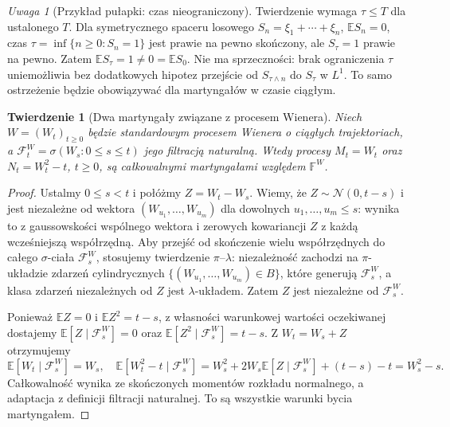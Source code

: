 \documentclass[11pt,a4paper,oneside]{report}
\numberwithin{equation}{chapter}
\theoremstyle{plain}
\newtheorem{twierdzenie}{Twierdzenie}[chapter]
\theoremstyle{definition}
\theoremstyle{remark}
\newtheorem{uwaga}{Uwaga}[chapter]
\newcommand{\E}{\mathbb{E}}
\newcommand{\calF}{\mathcal{F}}
\newcommand{\Normal}{\mathcal{N}}
\begin{document}
\begin{uwaga}[Przykład pułapki: czas nieograniczony]
Twierdzenie wymaga $\tau\le T$ dla ustalonego $T$.
Dla symetrycznego spaceru losowego
$S_n=\xi_1+\cdots+\xi_n$, $\E S_n=0$,
czas $\tau=\inf\{n\ge0:S_n=1\}$ jest prawie
na pewno skończony, ale $S_\tau=1$ prawie na pewno.
Zatem $\E S_\tau=1\ne0=\E S_0$.
Nie ma sprzeczności: brak ograniczenia $\tau$
uniemożliwia bez dodatkowych hipotez przejście
od $S_{\tau\wedge n}$ do $S_\tau$ w $L^1$.
To samo ostrzeżenie będzie obowiązywać dla
martyngałów w czasie ciągłym.
\end{uwaga}


\begin{twierdzenie}[Dwa martyngały związane z procesem Wienera]
Niech $W=(W_t)_{t\ge0}$ będzie standardowym procesem
Wienera o ciągłych trajektoriach,
a $\calF_t^W=\sigma(W_s:0\le s\le t)$ jego filtracją
naturalną. Wtedy procesy
$M_t=W_t$ oraz $N_t=W_t^2-t$, $t\ge0$,
są całkowalnymi martyngałami względem $\mathbb F^W$.
\end{twierdzenie}
\begin{proof}
Ustalmy $0\le s<t$ i połóżmy
$Z=W_t-W_s$. Wiemy, że $Z\sim\Normal(0,t-s)$
i jest niezależne od wektora
$(W_{u_1},\ldots,W_{u_m})$ dla dowolnych
$u_1,\ldots,u_m\le s$: wynika to z gaussowskości
wspólnego wektora i zerowych kowariancji $Z$
z każdą wcześniejszą współrzędną.
Aby przejść od skończenie wielu współrzędnych do
całego $\sigma$-ciała $\calF_s^W$, stosujemy
twierdzenie $\pi$--$\lambda$: niezależność zachodzi
na $\pi$-układzie zdarzeń cylindrycznych
$\{(W_{u_1},\ldots,W_{u_m})\in B\}$, które generują
$\calF_s^W$, a klasa zdarzeń niezależnych od $Z$
jest $\lambda$-układem. Zatem $Z$ jest niezależne
od $\calF_s^W$.

Ponieważ $\E Z=0$ i $\E Z^2=t-s$, z własności
warunkowej wartości oczekiwanej dostajemy
$\E[Z\mid\calF_s^W]=0$ oraz
$\E[Z^2\mid\calF_s^W]=t-s$.
Z $W_t=W_s+Z$ otrzymujemy
\[
\E[W_t\mid\calF_s^W]=W_s,
\quad
\E[W_t^2-t\mid\calF_s^W]
=W_s^2+2W_s\E[Z\mid\calF_s^W]
+(t-s)-t=W_s^2-s.
\]
Całkowalność wynika ze skończonych momentów
rozkładu normalnego, a adaptacja z definicji
filtracji naturalnej. To są wszystkie warunki
bycia martyngałem.
\end{proof}
\end{document}
